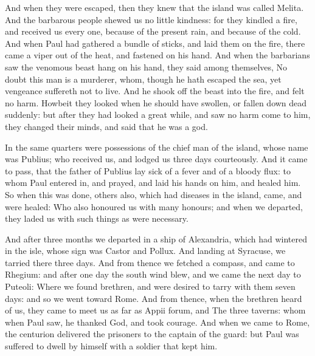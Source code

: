  And when they were escaped, then they knew that the
island was called Melita.  And the barbarous people shewed
us no little kindness: for they kindled a fire, and received us every
one, because of the present rain, and because of the cold.
 And when Paul had gathered a bundle of sticks, and laid
them on the fire, there came a viper out of the heat, and fastened on
his hand.  And when the barbarians saw the venomous beast
hang on his hand, they said among themselves, No doubt this man is a
murderer, whom, though he hath escaped the sea, yet vengeance suffereth
not to live.  And he shook off the beast into the fire,
and felt no harm.  Howbeit they looked when he should have
swollen, or fallen down dead suddenly: but after they had looked a great
while, and saw no harm come to him, they changed their minds, and said
that he was a god.

 In the same quarters were possessions of the chief man of
the island, whose name was Publius; who received us, and lodged us three
days courteously.  And it came to pass, that the father of
Publius lay sick of a fever and of a bloody flux: to whom Paul entered
in, and prayed, and laid his hands on him, and healed him.
 So when this was done, others also, which had diseases in
the island, came, and were healed:  Who also honoured us
with many honours; and when we departed, they laded us with such things
as were necessary.

 And after three months we departed in a ship of
Alexandria, which had wintered in the isle, whose sign was Castor and
Pollux.  And landing at Syracuse, we tarried there three
days.  And from thence we fetched a compass, and came to
Rhegium: and after one day the south wind blew, and we came the next day
to Puteoli:  Where we found brethren, and were desired to
tarry with them seven days: and so we went toward Rome. 
And from thence, when the brethren heard of us, they came to meet us as
far as Appii forum, and The three taverns: whom when Paul saw, he
thanked God, and took courage.  And when we came to Rome,
the centurion delivered the prisoners to the captain of the guard: but
Paul was suffered to dwell by himself with a soldier that kept him.

